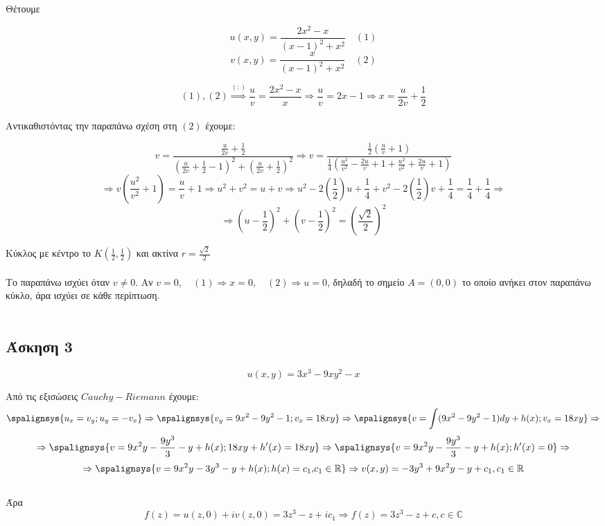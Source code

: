 \documentclass[12pt]{article}
\begin{document}
Θέτουμε 

$$ u(x{,}y)=\frac{2x^2-x}{(x-1)^2+x^2} \quad (1) $$
$$ v(x{,}y)= \frac{x}{(x-1)^2+x^2} \quad (2) $$

$$ (1),(2) \overset{(:)}{\Longrightarrow} \frac{u}{v}= \frac{2x^2-x}{x} \Rightarrow \frac{u}{v}= 2x-1 \Rightarrow x= \frac{u}{2v}+\frac{1}{2} $$ 
 \\
 Αντικαθιστόντας την παραπάνω σχέση στη $(2)$ έχουμε:
 
$$ v= \frac{\frac{u}{2v}+\frac{1}{2}}{\left( \frac{u}{2v}+\frac{1}{2} -1 \right)^2 + \left(\frac{u}{2v}+\frac{1}{2} \right)^2}
\Rightarrow
v=  \frac{ \frac{1}{2} \left( \frac{u}{v} + 1 \right) }{\frac{1}{4} \left( \frac{u^2}{v^2} -\frac{2u}{v}+1+\frac{u^2}{v^2}+ \frac{2u}{v} +1 \right) }
$$ 
 $$ \Rightarrow v\left(\frac{u^2}{v^2}+1\right) = \frac{u}{v} + 1
  \Rightarrow u^2+v^2=u+v \Rightarrow u^2-2\left(\frac{1}{2}\right)u+\frac{1}{4}+v^2-2\left(\frac{1}{2}\right)v+\frac{1}{4}=\frac{1}{4}+\frac{1}{4}\Rightarrow$$
 $$  \Rightarrow \left(u-\frac{1}{2}\right)^2+\left(v-\frac{1}{2}\right)^2=\left(\frac{\sqrt{2}}{2}\right)^2 $$

Κύκλος με κέντρο το $Κ\left(\frac{1}{2},\frac{1}{2}\right)$ και ακτίνα $r=\frac{\sqrt{2}}{2}$ 
\\ \\
Το παραπάνω ισχύει όταν $v\neq 0$.
Αν $v=0,\quad (1)\Rightarrow x=0, \quad (2) \Rightarrow u=0$, δηλαδή το σημείο $Α=(0,0)$ το οποίο ανήκει στον παραπάνω κύκλο, άρα ισχύει σε κάθε περίπτωση.
\\ \\

 \subsection{Άσκηση 3}

$$ u(x,y)=3x^3-9xy^2-x $$

Από τις εξισώσεις $ Cauchy-Riemann $ έχουμε:
\[
\spalignsys {u_x=v_y;u_y=-v_x} \Rightarrow \spalignsys {v_y=9x^2-9y^2-1;v_x=18xy}\Rightarrow \spalignsys {v=\int (9x^2-9y^2-1)dy +h(x) ;v_x=18xy}\Rightarrow 
\]
\[
\Rightarrow \spalignsys {v= 9x^2 y-\frac{9y^3}{3}-y +h(x)  ; 18xy+h'(x)=18xy}\Rightarrow \spalignsys {v= 9x^2 y-\frac{9y^3}{3}-y +h(x) ; h'(x)=0}\Rightarrow 
\]
\[ \Rightarrow \spalignsys {v= 9x^2y-3y^3-y +h(x); h(x)=c_1{,}c_1\in\mathbb{R}}
\Rightarrow v(x,y)= -3y^3+9x^2y-y+c_1,c_1\in\mathbb{R}
\]
\\
Άρα
\\ 
$$ f(z)=u(z,0)+iv(z,0)=3z^3-z+ic_1 \Rightarrow f(z)=3z^3-z+c, c\in \mathbb{C} $$
\newpage
\end{document}
